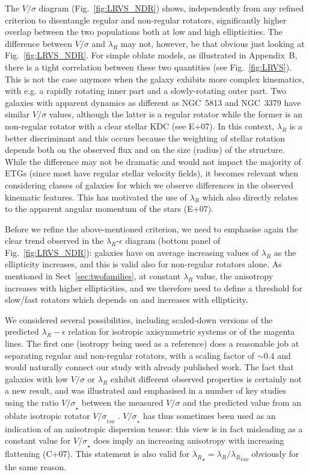 \documentclass[useAMS,usenatbib,usegraphicx]{mn2e}
\begin{document}
The $V/\sigma$ diagram (Fig.~\ref{fig:LRVS_NDR}) shows, independently from any refined
criterion to disentangle regular and non-regular rotators,
significantly higher overlap between the two populations both at low and high ellipticities. 
The difference between $V/\sigma$ and $\lambda_R$ may not, however, be that obvious just
looking at Fig.~\ref{fig:LRVS_NDR}. For simple oblate models, as illustrated in Appendix~B,
there is a tight correlation between these two quantities (see Fig.~\ref{fig:LRVS}).
This is not the case anymore when the galaxy exhibits more complex kinematics, with
e.g. a rapidly rotating inner part and a slowly-rotating outer part.
Two galaxies with apparent dynamics as different as NGC~5813 and NGC~3379 
have similar $V/\sigma$ values, although the latter is a regular rotator while the former 
is an non-regular rotator with a clear stellar KDC (see E+07). In this context, $\lambda_R$ is a 
better discriminant and this occurs because the weighting of stellar rotation 
depends both on the observed flux and on the size (radius) of the structure. 
While the difference may not be dramatic and would not impact the majority of
ETGs (since most have regular stellar velocity fields), it becomes relevant when
considering classes of galaxies for which we observe differences in the observed
kinematic features. This has motivated the use of ${\lambda_R}$ 
which also directly relates to the apparent angular momentum of the stars (E+07).

Before we refine the above-mentioned criterion, we need to emphasise again the clear 
trend observed in the $\lambda_R$-$\epsilon$ diagram (bottom
panel of Fig.~\ref{fig:LRVS_NDR}): galaxies have on average increasing values of 
$\lambda_R$ as the ellipticity increases, and this is valid also for non-regular
rotators alone. As mentioned in Sect~\ref{sec:twofamilies},
at constant $\lambda_R$ value, the anisotropy increases with higher
ellipticities, and we therefore need to define a threshold for slow/fast rotators
which depends on and increases with ellipticity.

We considered several possibilities, including scaled-down versions of the predicted ${\lambda_R}-\epsilon$ 
relation for isotropic axisymmetric systems or of the magenta lines.
The first one (isotropy being used as a reference) does a reasonable job 
at separating regular and non-regular rotators,
with a scaling factor of $\sim 0.4$ and would naturally connect our study with already published work.
The fact that galaxies with low ${V/\sigma}$ or $\lambda_R$ exhibit different observed
properties is certainly not a new result, and was illustrated and emphasised 
in a number of key studies \citep[e.g.,][]{Bender88, KB96} using the ratio
${V/\sigma}_{\star}$ between the measured ${V/\sigma}$ 
and the predicted value from an oblate isotropic rotator ${V/\sigma}_{iso}$
\citep[see e.g.][]{Davies+83}. ${V/\sigma}_{\star}$ has thus sometimes
been used as an indication of an anisotropic dispersion tensor: 
this view is in fact misleading as a constant value for ${V/\sigma}_{\star}$ does imply
an increasing anisotropy with increasing flattening (C+07). This statement is also valid 
for ${\lambda_R}_{\star} = {\lambda_R} / {\lambda_R}_{iso}$ obviously for the same reason.
\end{document}
